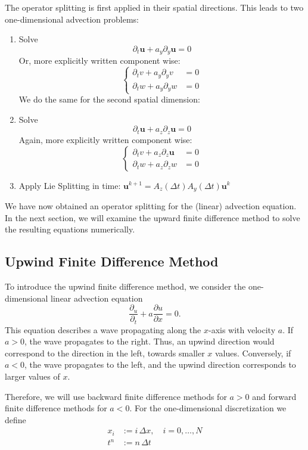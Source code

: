 The operator splitting is first applied in their spatial directions. This
leads to two one-dimensional advection problems:
\begin{enumerate}
    \item{Solve $$\partial_t \bm{u} + a_y\partial_y \bm{u} = 0 $$ Or, more
    explicitly written component wise: 
    $$ \begin{cases} \partial_t v + a_y \partial_y v &= 0 \\
    \partial_t w + a_y \partial_y w &= 0 \end{cases}$$} 
    We do the same for the second spatial dimension:
    \item{Solve $$\partial_t \bm{u} + a_z\partial_z \bm{u} = 0 $$ Again,
    more explicitly written component wise: 
    $$\begin{cases} \partial_t v + a_z \partial_z \bm{u} &= 0\\
    \partial_t w + a_z \partial_z w &= 0 \end{cases}$$} 
    \item{Apply Lie Splitting in time: $\bm{u}^{k+1} = 
        A_z(\Delta t)A_y(\Delta t)\bm{u}^{k}$}
\end{enumerate}

We have now obtained an operator splitting for the (linear) advection
equation. In the next section, we will examine the upward finite
difference method to solve the resulting equations numerically.

\subsection{Upwind Finite Difference Method}
To introduce the upwind finite difference method, we consider
the one-dimensional linear advection equation
$$\frac{\partial_u}{\partial_t}+a\frac{\partial u}{\partial x}=0.$$
This equation describes a wave propagating along the $x$-axis with
velocity $a$. If $a>0$, the wave propagates to the right. Thus, an upwind
direction would correspond to the direction in the left, towards smaller
$x$ values. Conversely, if $a<0$, the wave propagates to the left, and the
upwind direction corresponds to larger values of $x$.

Therefore, we will use backward finite difference methods for $a>0$ and
forward finite difference methods for $a<0$. For the one-dimensional
discretization we define
\[
\begin{aligned}
x_i &:= i \,\Delta x, \quad i = 0,\dots,N \\
t^n &:= n \,\Delta t
\end{aligned}
\]

